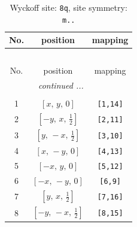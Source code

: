 \documentclass[fleqn,8pt]{jsarticle}
\begin{document}
\begin{longtable}{ccc}
\caption{Wyckoff site: {\tt 8q}, site symmetry: {\tt m..}}
 \\
 \hline \hline
No. & position & mapping \\ \hline \endfirsthead

\multicolumn{2}{l}{\tablename\ \thetable{}} \\
 \hline \hline
No. & position & mapping \\ \hline \endhead

 \hline \hline
\multicolumn{2}{r}{\footnotesize\it continued ...} \\ \endfoot

 \hline \hline
\multicolumn{2}{r}{} \\ \endlastfoot

1 & $\left[ x,\, y,\, 0 \right]$ & {\tt [1,14]} \\ \hline
2 & $\left[ - y,\, x,\, \frac{1}{2} \right]$ & {\tt [2,11]} \\ \hline
3 & $\left[ y,\, - x,\, \frac{1}{2} \right]$ & {\tt [3,10]} \\ \hline
4 & $\left[ x,\, - y,\, 0 \right]$ & {\tt [4,13]} \\ \hline
5 & $\left[ - x,\, y,\, 0 \right]$ & {\tt [5,12]} \\ \hline
6 & $\left[ - x,\, - y,\, 0 \right]$ & {\tt [6,9]} \\ \hline
7 & $\left[ y,\, x,\, \frac{1}{2} \right]$ & {\tt [7,16]} \\ \hline
8 & $\left[ - y,\, - x,\, \frac{1}{2} \right]$ & {\tt [8,15]} \\
\end{longtable}
\renewcommand{\arraystretch}{1.2}
\end{document}

